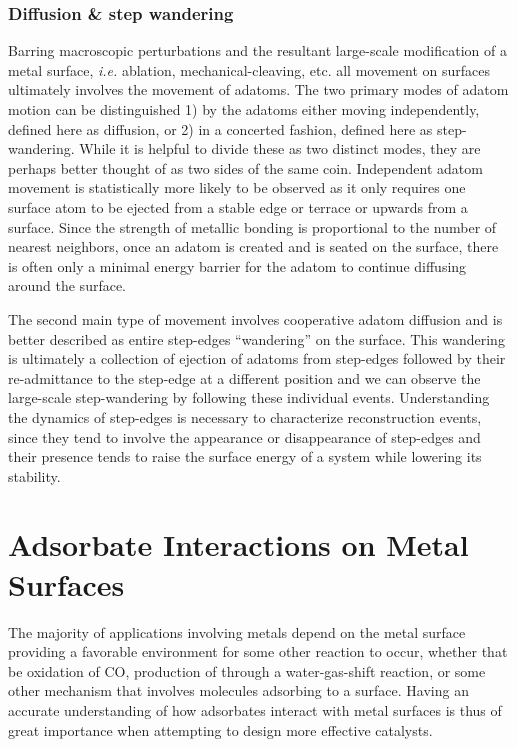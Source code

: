 \subsubsection{Diffusion \& step wandering}
Barring macroscopic perturbations and the resultant large-scale modification of
a metal surface, {\em i.e.} ablation, mechanical-cleaving, etc. all movement on
surfaces ultimately involves the movement of adatoms. The two primary modes of
adatom motion can be distinguished 1) by the adatoms either moving
independently, defined here as diffusion, or 2) in a concerted fashion, defined
here as step-wandering. While it is helpful to divide these as two distinct
modes, they are perhaps better thought of as two sides of the same coin.
Independent adatom movement is statistically more likely to be observed as it
only requires one surface atom to be ejected from a stable edge or terrace or
upwards from a surface.  Since the strength of metallic bonding is proportional
to the number of nearest neighbors, once an adatom is created and is seated on
the surface, there is often only a minimal energy barrier for the adatom to
continue diffusing around the surface.

The second main type of movement involves cooperative adatom diffusion and is
better described as entire step-edges ``wandering'' on the surface. This
wandering is ultimately a collection of ejection of adatoms from step-edges
followed by their re-admittance to the step-edge at a different position and we
can observe the large-scale step-wandering by following these individual
events. Understanding the dynamics of step-edges is necessary to characterize 
reconstruction events, since they tend to involve the appearance or disappearance of
step-edges and their presence tends to raise the surface energy of a system
while lowering its stability.

\section{Adsorbate Interactions on Metal Surfaces}
The majority of applications involving metals depend on the metal
surface providing a favorable environment for some other reaction to occur,
whether that be oxidation of CO, production of  through a
water-gas-shift reaction, or some other mechanism that involves molecules
adsorbing to a surface. Having an accurate understanding of how adsorbates
interact with metal surfaces is thus of great importance when attempting
to design more effective catalysts.

